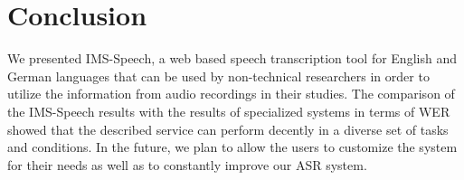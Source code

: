 \documentclass[12pt,a4paper]{article}
\begin{document}
\section{Conclusion}

We presented IMS-Speech, a web based speech transcription tool for English and German
languages that can be used by non-technical researchers
in order to utilize the information from audio recordings in their studies.
The comparison of the IMS-Speech results with the results of specialized
systems in terms of WER showed that the described service can
perform decently in a diverse set of tasks and conditions.
In the future, we plan to allow the users to customize the system
for their needs as well as to constantly improve our ASR system.



\end{document}
